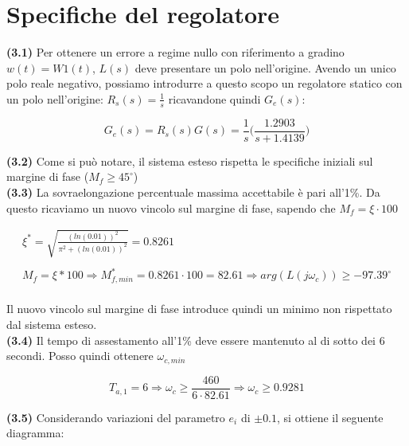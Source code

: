 \documentclass[a4paper,12pt,italian]{article}
\begin{document}
\newpage

\section{Specifiche del regolatore}

\textbf{(3.1)} Per ottenere un errore a regime nullo con riferimento a gradino $w(t) = W1(t)$, $L(s)$ deve presentare un polo nell'origine.
Avendo un unico polo reale negativo, possiamo introdurre a questo scopo un regolatore statico con un polo nell'origine: $ R_s(s) = \frac{1}{s} $ ricavandone quindi $ G_e(s) $:

\begin{equation*}
    G_e(s) = R_s(s)G(s) = \frac{1}{s}\Big(\frac{1.2903}{s + 1.4139}\Big)
\end{equation*}

\textbf{(3.2)} Come si può notare, il sistema esteso rispetta le specifiche iniziali sul margine di fase ($ M_f \geq 45^\circ$)\\

\textbf{(3.3)} La sovraelongazione percentuale massima accettabile è pari all'1\%. 
Da questo ricaviamo un nuovo vincolo sul margine di fase, sapendo che $M_f = \xi \cdot 100 $

\begin{equation*}
    \begin{array}{c}
        \xi^* = \sqrt{\frac{(ln(0.01))^2}{\pi^2+(ln(0.01))^2}} = 0.8261\\ \\
        M_f=\xi * 100 \Longrightarrow M^*_{f,min}=0.8261 \cdot 100 = 82.61
        \Longrightarrow arg(L(j\omega_c)) \geq -97.39^\circ
    \end{array}
\end{equation*}\\
Il nuovo vincolo sul margine di fase introduce quindi un minimo non rispettato dal sistema esteso.\\

\textbf{(3.4)} Il tempo di assestamento all'1\% deve essere mantenuto al di sotto dei 6 secondi.
Posso quindi ottenere $ \omega_{c,min} $

\begin{equation*}
    T_{a,1} = 6 
    \Longrightarrow 
    \omega_c \ge \frac{460}{6 \cdot 82.61}
    \Longrightarrow
    \omega_c \ge 0.9281
\end{equation*}


\textbf{(3.5)} Considerando variazioni del parametro $e_i$ di $\pm 0.1$, si ottiene il seguente diagramma:
\end{document}
